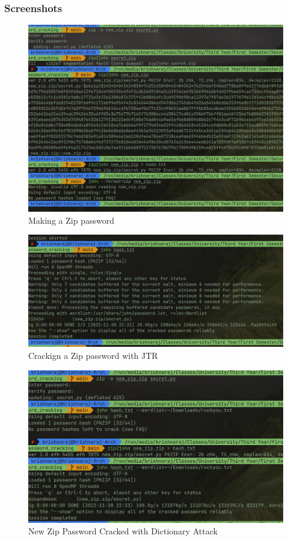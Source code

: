 \documentclass[11pt]{article}
\begin{document}
\subsubsection{Screenshots}

\begin{figure}[H]
    \centering
    \includegraphics[width=.95\textwidth]{zip pass.png}
    \caption{Making a Zip password}
\end{figure}

\begin{figure}[H]
    \centering
    \includegraphics[width=.95\textwidth]{zip cracked.png}
    \caption{Crackign a Zip password with JTR}
\end{figure}

\begin{figure}[H]
    \centering
    \includegraphics[width=.95\textwidth]{zip_with_new.png}
    \caption{New Zip Password Cracked with Dictionary Attack}
\end{figure}
\end{document}
